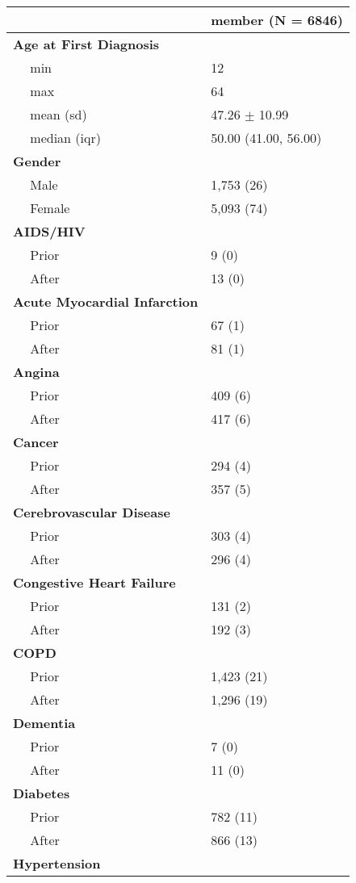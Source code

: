 \documentclass[10pt]{article}
\begin{document}
\begin{tabular}{l|l}
\hline
 & member (N = 6846)\\
\hline
\bf{Age at First Diagnosis} & ~\\
\hline
~~ min & 12\\
\hline
~~ max & 64\\
\hline
~~ mean (sd) & 47.26 $\pm$ 10.99\\
\hline
~~ median (iqr) & 50.00 (41.00, 56.00)\\
\hline
\bf{Gender} & ~\\
\hline
~~ Male & 1,753 (26)\\
\hline
~~ Female & 5,093 (74)\\
\hline
\bf{AIDS/HIV} & ~\\
\hline
~~ Prior & 9 (0)\\
\hline
~~ After & 13 (0)\\
\hline
\bf{Acute Myocardial Infarction} & ~\\
\hline
~~ Prior & 67 (1)\\
\hline
~~ After & 81 (1)\\
\hline
\bf{Angina} & ~\\
\hline
~~ Prior & 409 (6)\\
\hline
~~ After & 417 (6)\\
\hline
\bf{Cancer} & ~\\
\hline
~~ Prior & 294 (4)\\
\hline
~~ After & 357 (5)\\
\hline
\bf{Cerebrovascular Disease} & ~\\
\hline
~~ Prior & 303 (4)\\
\hline
~~ After & 296 (4)\\
\hline
\bf{Congestive Heart Failure} & ~\\
\hline
~~ Prior & 131 (2)\\
\hline
~~ After & 192 (3)\\
\hline
\bf{COPD} & ~\\
\hline
~~ Prior & 1,423 (21)\\
\hline
~~ After & 1,296 (19)\\
\hline
\bf{Dementia} & ~\\
\hline
~~ Prior & 7 (0)\\
\hline
~~ After & 11 (0)\\
\hline
\bf{Diabetes} & ~\\
\hline
~~ Prior & 782 (11)\\
\hline
~~ After & 866 (13)\\
\hline
\bf{Hypertension} & ~\\

\end{tabular}
\end{document}
